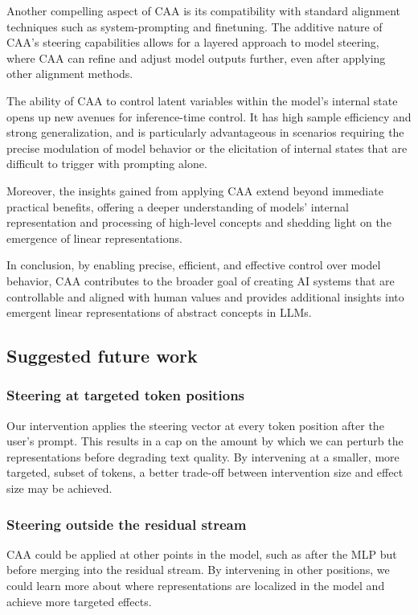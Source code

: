\documentclass[11pt]{article}
\begin{document}
Another compelling aspect of CAA is its compatibility with standard alignment techniques such as system-prompting and finetuning. The additive nature of CAA's steering capabilities allows for a layered approach to model steering, where CAA can refine and adjust model outputs further, even after applying other alignment methods. 

The ability of CAA to control latent variables within the model's internal state opens up new avenues for inference-time control. It has high sample efficiency and strong generalization, and is particularly advantageous in scenarios requiring the precise modulation of model behavior or the elicitation of internal states that are difficult to trigger with prompting alone. 

Moreover, the insights gained from applying CAA extend beyond immediate practical benefits, offering a deeper understanding of models' internal representation and processing of high-level concepts and shedding light on the emergence of linear representations. 

In conclusion, by enabling precise, efficient, and effective control over model behavior, CAA contributes to the broader goal of creating AI systems that are controllable and aligned with human values and provides additional insights into emergent linear representations of abstract concepts in LLMs.

\subsection{Suggested future work}

\subsubsection*{Steering at targeted token positions}
Our intervention applies the steering vector at every token position after the user's prompt. This results in a cap on the amount by which we can perturb the representations before degrading text quality. By intervening at a smaller, more targeted, subset of tokens, a better trade-off between intervention size and effect size may be achieved. 

\subsubsection*{Steering outside the residual stream}
CAA could be applied at other points in the model, such as after the MLP but before merging into the residual stream. By intervening in other positions, we could learn more about where representations are localized in the model and achieve more targeted effects. 
\end{document}
